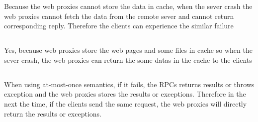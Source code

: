 \documentclass[11pt]{article}
\begin{document}
Because the web proxies cannot store the data in cache, when the sever crash the web proxies cannot fetch the data from the remote sever and cannot return corresponding reply. Therefore the clients can experience the similar failure
\subsection{}
Yes, because web proxies store the web pages and some files in cache so when the sever crash, the web proxies can return the some datas in the cache to the clients

\subsection{}
When using at-most-once semantics, if it fails, the RPCs returns results or throws exception and the web proxies stores the results or exceptions. Therefore in the next the time, if the clients send the same request, the web proxies will directly return the results or exceptions.
\end{document}
